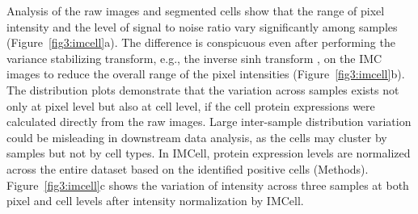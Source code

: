 \documentclass{mynature}
\begin{document}
Analysis of the raw images and segmented cells show that the range of pixel intensity and the level of signal to noise ratio vary significantly among samples (Figure~\ref{fig3:imcell}a). 
The difference is conspicuous even after performing the variance stabilizing transform, e.g., the inverse sinh transform \cite{bendall2011single}, on the IMC images to reduce the overall range of the pixel intensities (Figure~\ref{fig3:imcell}b). 
The distribution plots demonstrate that the variation across samples exists not only at pixel level but also at cell level, if the cell protein expressions were calculated directly from the raw images. 
Large inter-sample distribution variation could be misleading in downstream data analysis, 
as the cells may cluster by samples but not by cell types. 
In IMCell, protein expression levels are normalized across the entire dataset based on the identified positive cells (Methods). 
Figure~\ref{fig3:imcell}c shows the variation of intensity across three samples at both pixel and cell levels after intensity normalization by IMCell.  
\end{document}
